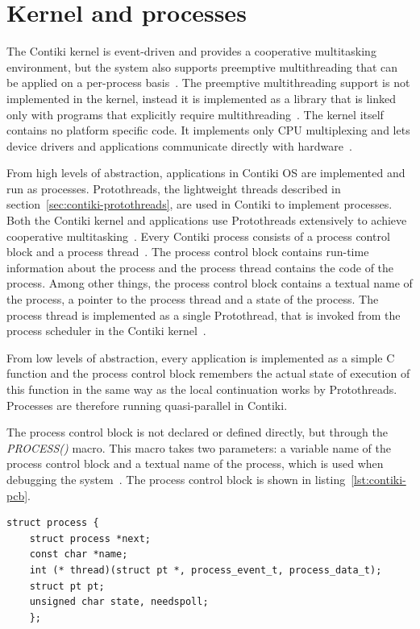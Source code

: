 
\section{Kernel and processes}\label{sec:contiki-kernel}
The Contiki kernel is event-driven and provides a cooperative multitasking
environment, but the system also supports preemptive
multithreading that can be applied on a per-process basis~\cite{paper-contiki}.
The preemptive multithreading support is not implemented in the kernel, instead
it is implemented as a library that is linked only with programs that
explicitly require multithreading~\cite{paper-contiki}.
The kernel itself contains no platform specific code.
It implements only CPU multiplexing and
lets device drivers and applications communicate directly with hardware~\cite{paper-contiki}.

From high levels of abstraction,
applications in Contiki OS are implemented and run as processes.
Protothreads, the lightweight threads described in section~\ref{sec:contiki-protothreads},
are used in Contiki to implement processes.
Both the Contiki kernel and applications use
Protothreads extensively to achieve cooperative multitasking~\cite{contiki-wiki-faq}.
Every Contiki process consists of a process control block and a process thread~\cite{contiki-wiki-processes}.
The process control block contains run-time information about the process and
the process thread contains the code of the process.
Among other things, the process control block contains
a textual name of the process, a pointer to the process thread and a state of the process.
The process thread is implemented as a single Protothread,
that is invoked from the process scheduler in the Contiki kernel~\cite{contiki-wiki-processes}.

From low levels of abstraction,
every application is implemented as a simple C function
and the process control block remembers the actual state of execution of this function
in the same way as the local continuation works by Protothreads.
Processes are therefore running quasi-parallel in Contiki.

The process control block is not declared or defined directly,
but through the {\it{PROCESS()}} macro.
This macro takes two parameters: a variable name of the process control block
and a textual name of the process,
which is used when debugging the system~\cite{contiki-wiki-processes}.
The process control block is shown in listing~\ref{lst:contiki-pcb}.
\bigskip
\begin{lstlisting}[caption={Process control block in Contiki OS (source~\cite{contiki-wiki-processes})},label={lst:contiki-pcb}]
struct process {
	struct process *next;
	const char *name;
	int (* thread)(struct pt *, process_event_t, process_data_t);
	struct pt pt;
	unsigned char state, needspoll;
	};
\end{lstlisting}

